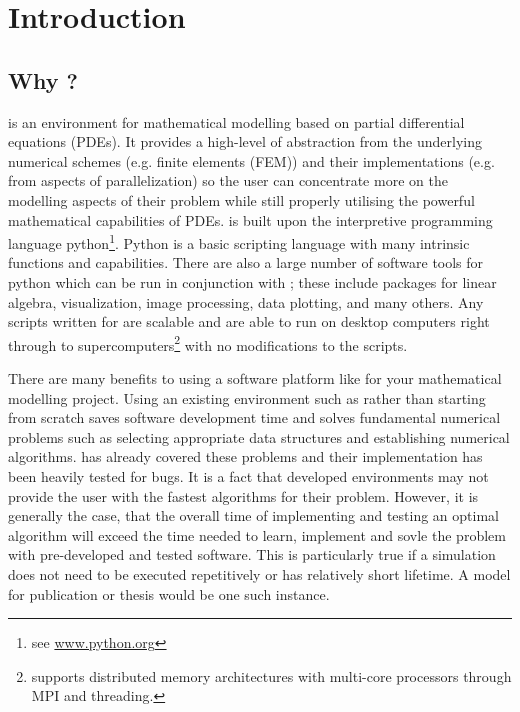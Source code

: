 
%
%
%

\chapter{Introduction}
\label{CHAP INTRO}
\section{Why \esc?}
\esc is an environment for mathematical modelling based on partial differential equations (PDEs). It provides a high-level of abstraction from the underlying numerical schemes (e.g. finite elements (FEM)) and their implementations (e.g. from aspects of parallelization) so the user can concentrate more on the modelling aspects of their problem while still properly utilising the powerful mathematical capabilities of PDEs. \esc is built upon the interpretive programming language python\footnote{see \url{www.python.org} }. Python is a basic scripting language with many intrinsic functions and capabilities. There are also  a large number of software tools for python which can be run in conjunction with \esc; these include packages for linear algebra, visualization, image processing, data plotting, and many others. Any scripts written for \esc are scalable and are able to run on desktop computers right through to supercomputers\footnote{\esc supports distributed memory architectures with multi-core processors through MPI and threading.} with no modifications to the scripts. 

There are many benefits to using a software platform like \esc for your mathematical modelling project. Using an existing environment such as \esc rather than starting from scratch saves software development time and solves fundamental numerical problems such as selecting appropriate data structures and establishing numerical algorithms. \esc has already covered these problems and their implementation has been heavily tested for bugs. It is a fact that developed environments may not provide the user with the fastest algorithms for their problem. However, it is generally the case, that the overall time of implementing and testing an optimal algorithm will exceed the time needed to learn, implement and sovle the problem with pre-developed and tested software. This is particularly true if a simulation does not need to be executed repetitively or has relatively short lifetime. A model for publication or thesis would be one such instance. 

